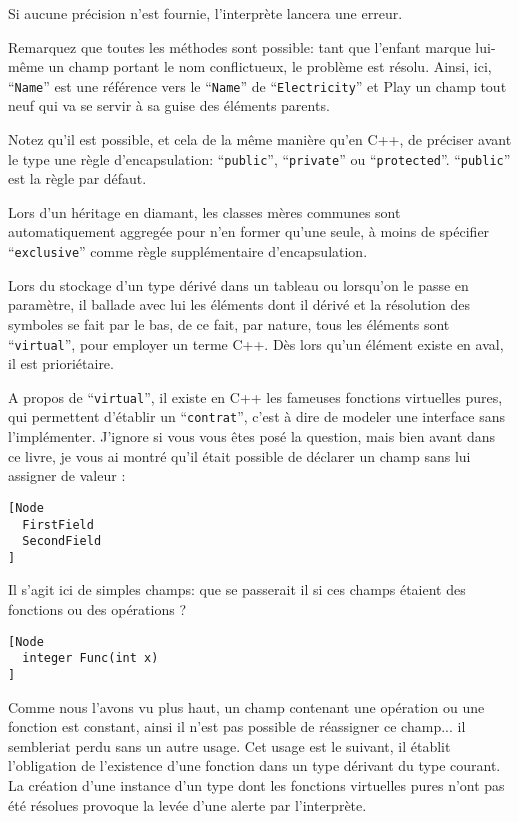 \documentclass[a5paper, 12pt]{book}
\begin{document}
Si aucune précision n'est fournie, l'interprète lancera
une erreur.

Remarquez que toutes les méthodes sont possible: tant
que l'enfant marque lui-même un champ portant le nom
conflictueux, le problème est résolu. Ainsi, ici,
``\verb!Name!'' est une référence vers le ``\verb!Name!'' de ``\verb!Electricity!''
et Play un champ tout neuf qui va se servir à sa guise
des éléments parents.

Notez qu'il est possible, et cela de la même manière qu'en
C++, de préciser avant le type une règle d'encapsulation:
``\verb!public!'', ``\verb!private!'' ou ``\verb!protected!''. ``\verb!public!'' est
la règle par défaut.

Lors d'un héritage en diamant, les classes mères communes
sont automatiquement aggregée pour n'en former qu'une seule,
à moins de spécifier ``\verb!exclusive!'' comme règle supplémentaire
d'encapsulation.

Lors du stockage d'un type dérivé dans un tableau
ou lorsqu'on le passe en paramètre, il ballade avec lui les
éléments dont il dérivé et la résolution des symboles se fait
par le bas, de ce fait, par nature, tous les éléments sont
``\verb!virtual!'', pour employer un terme C++. Dès lors qu'un élément
existe en aval, il est prioriétaire.

A propos de ``\verb!virtual!'', il existe en C++ les fameuses fonctions
virtuelles pures, qui permettent d'établir un ``\verb!contrat!'', c'est
à dire de modeler une interface sans l'implémenter. J'ignore
si vous vous êtes posé la question, mais bien avant dans ce
livre, je vous ai montré qu'il était possible de déclarer
un champ sans lui assigner de valeur :\\

\begin{verbatim}
[Node
  FirstField
  SecondField
]
\end{verbatim}

Il s'agit ici de simples champs: que se passerait il si ces
champs étaient des fonctions ou des opérations ?\\

\begin{verbatim}
[Node
  integer Func(int x)
]
\end{verbatim}

Comme nous l'avons vu plus haut, un champ contenant une
opération ou une fonction est constant, ainsi il n'est
pas possible de réassigner ce champ... il sembleriat perdu
sans un autre usage. Cet usage est le suivant, il établit
l'obligation de l'existence d'une fonction dans un type
dérivant du type courant. La création d'une instance
d'un type dont les fonctions virtuelles pures n'ont
pas été résolues provoque la levée d'une alerte par
l'interprète.
\end{document}
